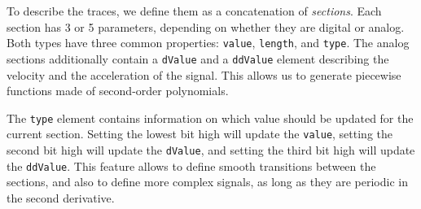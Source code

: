       To describe the traces, we define them as a concatenation of \textit{sections}. Each section has 3 or 5 parameters, depending on whether they are digital or analog. Both types have three common properties: \texttt{value}, \texttt{length}, and \texttt{type}. The analog sections additionally contain a \texttt{dValue} and a \texttt{ddValue} element describing the velocity and the acceleration of the signal. This allows us to generate piecewise functions made of second-order polynomials.

      The \texttt{type} element contains information on which value should be updated for the current section. Setting the lowest bit high will update the \texttt{value}, setting the second bit high will update the \texttt{dValue}, and setting the third bit high will update the \texttt{ddValue}. This feature allows to define smooth transitions between the sections, and also to define more complex signals, as long as they are periodic in the second derivative.


